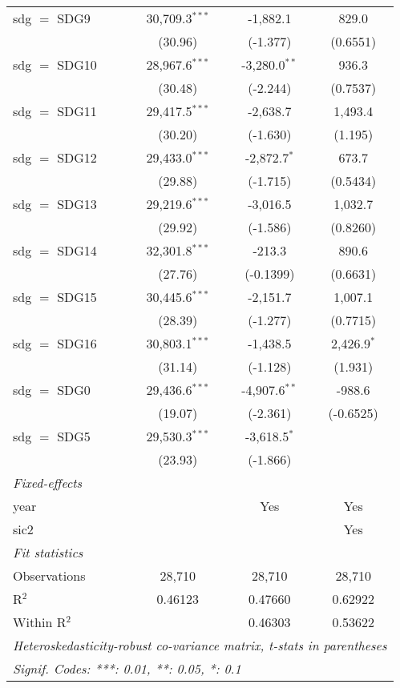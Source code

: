 \begin{tabular}{lccc}
   sdg $=$ SDG9  & 30,709.3$^{***}$ & -1,882.1         & 829.0\\   
                 & (30.96)          & (-1.377)         & (0.6551)\\   
   sdg $=$ SDG10 & 28,967.6$^{***}$ & -3,280.0$^{**}$  & 936.3\\   
                 & (30.48)          & (-2.244)         & (0.7537)\\   
   sdg $=$ SDG11 & 29,417.5$^{***}$ & -2,638.7         & 1,493.4\\   
                 & (30.20)          & (-1.630)         & (1.195)\\   
   sdg $=$ SDG12 & 29,433.0$^{***}$ & -2,872.7$^{*}$   & 673.7\\   
                 & (29.88)          & (-1.715)         & (0.5434)\\   
   sdg $=$ SDG13 & 29,219.6$^{***}$ & -3,016.5         & 1,032.7\\   
                 & (29.92)          & (-1.586)         & (0.8260)\\   
   sdg $=$ SDG14 & 32,301.8$^{***}$ & -213.3           & 890.6\\   
                 & (27.76)          & (-0.1399)        & (0.6631)\\   
   sdg $=$ SDG15 & 30,445.6$^{***}$ & -2,151.7         & 1,007.1\\   
                 & (28.39)          & (-1.277)         & (0.7715)\\   
   sdg $=$ SDG16 & 30,803.1$^{***}$ & -1,438.5         & 2,426.9$^{*}$\\   
                 & (31.14)          & (-1.128)         & (1.931)\\   
   sdg $=$ SDG0  & 29,436.6$^{***}$ & -4,907.6$^{**}$  & -988.6\\   
                 & (19.07)          & (-2.361)         & (-0.6525)\\   
   sdg $=$ SDG5  & 29,530.3$^{***}$ & -3,618.5$^{*}$   &   \\   
                 & (23.93)          & (-1.866)         &   \\   
   \midrule
   \emph{Fixed-effects}\\
   year          &                  & Yes              & Yes\\  
   sic2          &                  &                  & Yes\\  
   \midrule
   \emph{Fit statistics}\\
   Observations  & 28,710           & 28,710           & 28,710\\  
   R$^2$         & 0.46123          & 0.47660          & 0.62922\\  
   Within R$^2$  &                  & 0.46303          & 0.53622\\  
   \midrule \midrule
   \multicolumn{4}{l}{\emph{Heteroskedasticity-robust co-variance matrix, t-stats in parentheses}}\\
   \multicolumn{4}{l}{\emph{Signif. Codes: ***: 0.01, **: 0.05, *: 0.1}}\\
\end{tabular}
\par\endgroup


